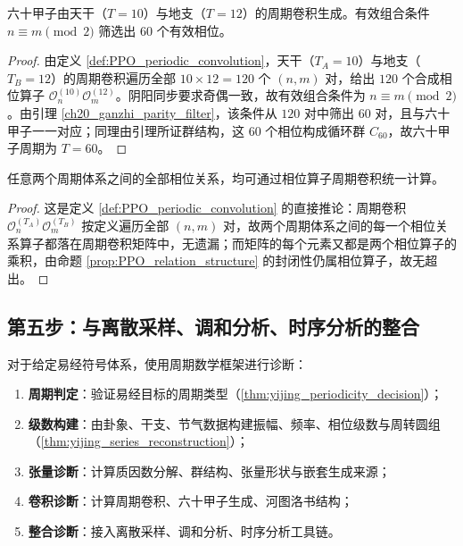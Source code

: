 \begin{theorem}[六十甲子的周期卷积生成]\label{thm:ganzhi_periodic_convolution}
六十甲子由天干（$T=10$）与地支（$T=12$）的周期卷积生成。有效组合条件 $n \equiv m \pmod{2}$ 筛选出 $60$ 个有效相位。
\end{theorem}

\begin{proof}
由定义 \ref{def:PPO_periodic_convolution}，天干（$T_A = 10$）与地支（$T_B = 12$）的周期卷积遍历全部 $10 \times 12 = 120$ 个 $(n,m)$ 对，给出 $120$ 个合成相位算子 $\mathcal{O}_n^{(10)} \mathcal{O}_m^{(12)}$。阴阳同步要求奇偶一致，故有效组合条件为 $n \equiv m \pmod 2$。由引理 \ref{ch20_ganzhi_parity_filter}，该条件从 $120$ 对中筛出 $60$ 对，且与六十甲子一一对应；同理由引理所证群结构，这 $60$ 个相位构成循环群 $C_{60}$，故六十甲子周期为 $T = 60$。
\end{proof}

\begin{corollary}[所有周期体系的周期卷积统一]\label{cor:all_periods_periodic_conv}
任意两个周期体系之间的全部相位关系，均可通过相位算子周期卷积统一计算。
\end{corollary}

\begin{proof}
这是定义 \ref{def:PPO_periodic_convolution} 的直接推论：周期卷积 $\mathcal{O}_n^{(T_A)} \mathcal{O}_m^{(T_B)}$ 按定义遍历全部 $(n,m)$ 对，故两个周期体系之间的每一个相位关系算子都落在周期卷积矩阵中，无遗漏；而矩阵的每个元素又都是两个相位算子的乘积，由命题 \ref{prop:PPO_relation_structure} 的封闭性仍属相位算子，故无超出。
\end{proof}

\subsection{第五步：与离散采样、调和分析、时序分析的整合}

\begin{definition}[易经周期诊断流程]\label{def:yijing_periodic_diagnosis}
对于给定易经符号体系，使用周期数学框架进行诊断：
\begin{enumerate}[label=(\roman*)]
    \item \textbf{周期判定}：验证易经目标的周期类型（\cref{thm:yijing_periodicity_decision}）；
    \item \textbf{级数构建}：由卦象、干支、节气数据构建振幅、频率、相位级数与周转圆组（\cref{thm:yijing_series_reconstruction}）；
    \item \textbf{张量诊断}：计算质因数分解、群结构、张量形状与嵌套生成来源；
    \item \textbf{卷积诊断}：计算周期卷积、六十甲子生成、河图洛书结构；
    \item \textbf{整合诊断}：接入离散采样、调和分析、时序分析工具链。
\end{enumerate}
\end{definition}

